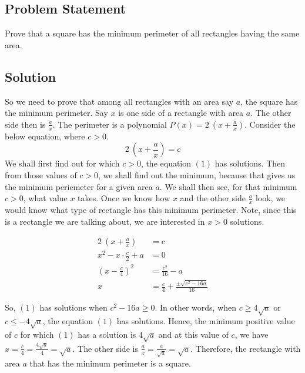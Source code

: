 \documentclass[12pt]{article}
\begin{document}
\subsection*{Problem Statement}
Prove that a square has the minimum perimeter of all rectangles having the same area.

\subsection*{Solution}
So we need to prove that among all rectangles with an area say $a$, the square has the minimum perimeter. Say $x$ is one side of a rectangle with area $a$. The other side then is $\frac{a}{x}$. The perimeter is a polynomial $P(x) = 2\ \left( x + \frac{a}{x} \right)$. Consider the below equation, where $c > 0$.
\setcounter{equation}{0}
\begin{equation}
	2\ \left( x + \frac{a}{x} \right) = c
\end{equation}
We shall first find out for which $c > 0$, the equation $(1)$ has solutions. Then from those values of $c > 0$, we shall find out the minimum, because that gives us the minimum periemeter for a given area $a$. We shall then see, for that minimum $c > 0$, what value $x$ takes. Once we know how $x$ and the other side $\frac{a}{x}$ look, we would know what type of rectangle has this minimum perimeter. Note, since this is a rectangle we are talking about, we are interested in $x > 0$ solutions.

\begin{equation*}
	\begin{aligned}
		2\ \left( x + \frac{a}{x} \right) &= c\\
		x^2 - x\cdot \frac{c}{2} + a &= 0\\
		\left( x - \frac{c}{4} \right)^2 &= \frac{c^2}{16} - a\\
		x &= \frac{c}{4} + \frac{ \pm \sqrt{ c^2 - 16a } }{16}
	\end{aligned}
\end{equation*}

So, $(1)$ has solutions when $c^2-16a \geq 0$. In other words, when $c \geq 4\sqrt{a}$ or $c \leq -4\sqrt{a}$, the equation $(1)$ has solutions. Hence, the minimum positive value of $c$ for which $(1)$ has a solution is $4\sqrt{a}$ and at this value of $c$, we have $x = \frac{c}{4} = \frac{4\sqrt{a}}{4} = \sqrt{a}$. The other side is $\frac{a}{x} = \frac{a}{\sqrt{a}} = \sqrt{a}$. Therefore, the rectangle with area $a$ that has the minimum perimeter is a square.\\
\end{document}
